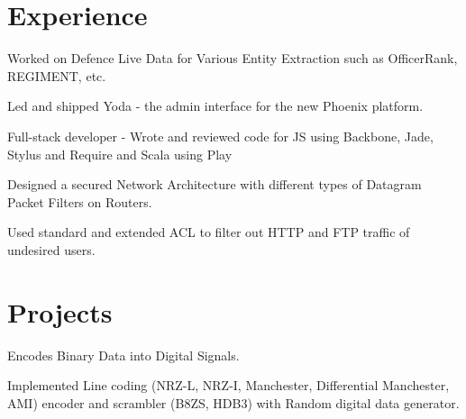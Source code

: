 \documentclass[]{deedy-resume-openfont}
\begin{document}
\begin{minipage}[t]{0.66\textwidth} 


\section{Experience}

\vspace{\topsep} %
\begin{tightemize}
\item Worked on Defence Live Data for Various Entity Extraction such as OfficerRank, REGIMENT, etc.
\item Led and shipped Yoda - the admin interface for the new Phoenix platform. 
\item Full-stack developer - Wrote and reviewed code for JS using Backbone, Jade, Stylus and Require and Scala using Play
\end{tightemize}
\sectionsep

\begin{tightemize}
\item Designed a secured Network Architecture with different types of Datagram Packet Filters on Routers.
\item Used standard and extended ACL to filter out HTTP and FTP traffic of undesired users.
\end{tightemize}
\sectionsep


\section{Projects}
\descript{}
\begin{tightemize}
\item Encodes Binary Data into Digital Signals.
\item Implemented Line coding (NRZ-L, NRZ-I, Manchester, Differential Manchester, AMI) encoder and scrambler (B8ZS, HDB3) with Random digital data generator. 
\end{tightemize}
\sectionsep


\end{minipage}
\end{document}
